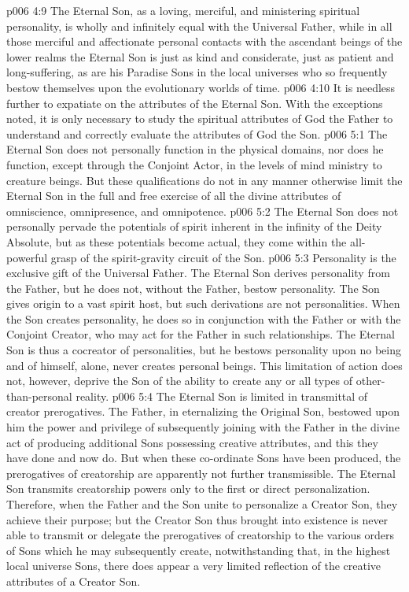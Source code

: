 \vs p006 4:9 \pc The Eternal Son, as a loving, merciful, and ministering spiritual personality, is wholly and infinitely equal with the Universal Father, while in all those merciful and affectionate personal contacts with the ascendant beings of the lower realms the Eternal Son is just as kind and considerate, just as patient and long\hyp{}suffering, as are his Paradise Sons in the local universes who so frequently bestow themselves upon the evolutionary worlds of time.
\vs p006 4:10 It is needless further to expatiate on the attributes of the Eternal Son. With the exceptions noted, it is only necessary to study the spiritual attributes of God the Father to understand and correctly evaluate the attributes of God the Son.
\vs p006 5:1 The Eternal Son does not personally function in the physical domains, nor does he function, except through the Conjoint Actor, in the levels of mind ministry to creature beings. But these qualifications do not in any manner otherwise limit the Eternal Son in the full and free exercise of all the divine attributes of  omniscience, omnipresence, and omnipotence.
\vs p006 5:2 The Eternal Son does not personally pervade the potentials of spirit inherent in the infinity of the Deity Absolute, but as these potentials become actual, they come within the all\hyp{}powerful grasp of the spirit\hyp{}gravity circuit of the Son.
\vs p006 5:3 Personality is the exclusive gift of the Universal Father. The Eternal Son derives personality from the Father, but he does not, without the Father, bestow personality. The Son gives origin to a vast spirit host, but such derivations are not personalities. When the Son creates personality, he does so in conjunction with the Father or with the Conjoint Creator, who may act for the Father in such relationships. The Eternal Son is thus a cocreator of personalities, but he bestows personality upon no being and of himself, alone, never creates personal beings. This limitation of action does not, however, deprive the Son of the ability to create any or all types of other\hyp{}than\hyp{}personal reality.
\vs p006 5:4 The Eternal Son is limited in transmittal of creator prerogatives. The Father, in eternalizing the Original Son, bestowed upon him the power and privilege of subsequently joining with the Father in the divine act of producing additional Sons possessing creative attributes, and this they have done and now do. But when these co\hyp{}ordinate Sons have been produced, the prerogatives of creatorship are apparently not further transmissible. The Eternal Son transmits creatorship powers only to the first or direct personalization. Therefore, when the Father and the Son unite to personalize a Creator Son, they achieve their purpose; but the Creator Son thus brought into existence is never able to transmit or delegate the prerogatives of creatorship to the various orders of Sons which he may subsequently create, notwithstanding that, in the highest local universe Sons, there does appear a very limited reflection of the creative attributes of a Creator Son.
